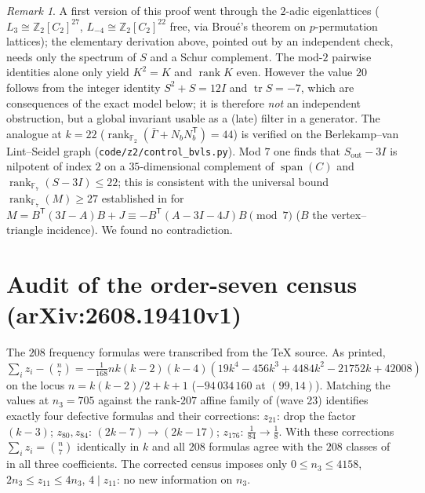 \documentclass[11pt,a4paper]{article}
\theoremstyle{remark}
\newtheorem{remark}[theorem]{Remark}
\newcommand{\F}{\mathbb{F}}
\newcommand{\Z}{\mathbb{Z}}
\newcommand{\rk}{\operatorname{rank}}
\begin{document}
\begin{remark}
A first version of this proof went through the $2$-adic eigenlattices ($L_3\cong\Z_2[C_2]^{27}$, $L_{-4}\cong\Z_2[C_2]^{22}$ free, via Brou\'e's theorem on
$p$-permutation lattices); the elementary derivation above, pointed out by an independent check, needs only the spectrum of $S$ and a Schur complement.
The mod-$2$ pairwise identities alone only yield $K^2=K$ and $\rk K$ even. However the value $20$ follows from the integer identity $S^2+S=12I$ and $\operatorname{tr}S=-7$,
which are consequences of the exact model below; it is therefore \emph{not} an independent obstruction, but a global invariant usable as a (late) filter in a generator.
The analogue at $k=22$ ($\rk_{\F_2}(\bar\Gamma+N_bN_b^{\mathsf T})=44$) is verified on the Berlekamp--van Lint--Seidel graph (\texttt{code/z2/control\_bvls.py}).
Mod $7$ one finds that $S_{\mathrm{out}}-3I$ is nilpotent of index $2$ on a $35$-dimensional complement of $\operatorname{span}(C)$ and
$\rk_{\F_7}(S-3I)\le22$; this is consistent with the universal bound $\rk_{\F_7}(M)\ge27$ established in \cite{repo} for
$M=B^{\mathsf T}(3I-A)B+J\equiv-B^{\mathsf T}(A-3I-4J)B\pmod 7$ ($B$ the vertex--triangle incidence). We found no contradiction.
\end{remark}

\section{Audit of the order-seven census (arXiv:2608.19410v1)}
The $208$ frequency formulas were transcribed from the \TeX{} source. As printed, $\sum_i z_i-\binom{n}{7}=-\tfrac{1}{168}nk(k-2)(k-4)(19k^4-456k^3+4484k^2-21752k+42008)$
on the locus $n=k(k-2)/2+k+1$ ($-94\,034\,160$ at $(99,14)$). Matching the values at $n_3=705$ against the rank-$207$ affine family of \cite{repo} (wave 23) identifies exactly four
defective formulas and their corrections: $z_{21}$: drop the factor $(k-3)$; $z_{80},z_{84}$: $(2k-7)\to(2k-17)$; $z_{176}$: $\tfrac1{84}\to\tfrac18$.
With these corrections $\sum_i z_i=\binom n7$ identically in $k$ and all $208$ formulas agree with the $208$ classes of \cite{repo} in all three coefficients.
The corrected census imposes only $0\le n_3\le4158$, $2n_3\le z_{11}\le4n_3$, $4\mid z_{11}$: no new information on $n_3$.
\end{document}
